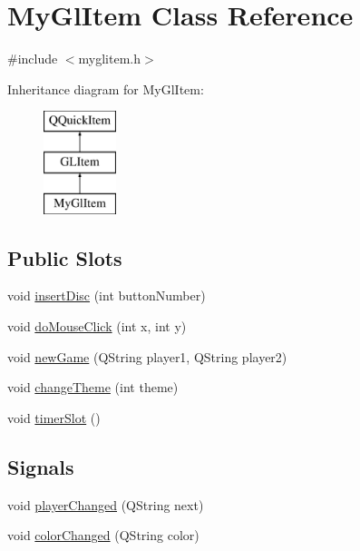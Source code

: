 \hypertarget{class_my_gl_item}{}\section{My\+Gl\+Item Class Reference}
\label{class_my_gl_item}


{\ttfamily \#include $<$myglitem.\+h$>$}

Inheritance diagram for My\+Gl\+Item\+:\begin{figure}[H]
\begin{center}
\leavevmode
\includegraphics[height=3.000000cm]{class_my_gl_item}
\end{center}
\end{figure}
\subsection*{Public Slots}
\begin{DoxyCompactItemize}
\item 
void \mbox{\hyperlink{class_my_gl_item_aede114472dca4859706ee76de910e7bf}{insert\+Disc}} (int button\+Number)
\item 
void \mbox{\hyperlink{class_my_gl_item_a76e20888c579fb444dc071a43a301ced}{do\+Mouse\+Click}} (int x, int y)
\item 
void \mbox{\hyperlink{class_my_gl_item_ad6a0178cad3d36add83687a4f95ca668}{new\+Game}} (Q\+String player1, Q\+String player2)
\item 
void \mbox{\hyperlink{class_my_gl_item_a613c4a856e605fffbcf0968f821e8823}{change\+Theme}} (int theme)
\item 
void \mbox{\hyperlink{class_my_gl_item_adbaf81ef21b3437d37571fa897594550}{timer\+Slot}} ()
\end{DoxyCompactItemize}
\subsection*{Signals}
\begin{DoxyCompactItemize}
\item 
void \mbox{\hyperlink{class_my_gl_item_a93137c1e883f74e699e3dd164cd1cd43}{player\+Changed}} (Q\+String next)
\item 
void \mbox{\hyperlink{class_my_gl_item_a7bab02e6f11d653e97b328a953d81c82}{color\+Changed}} (Q\+String color)
\end{DoxyCompactItemize}
